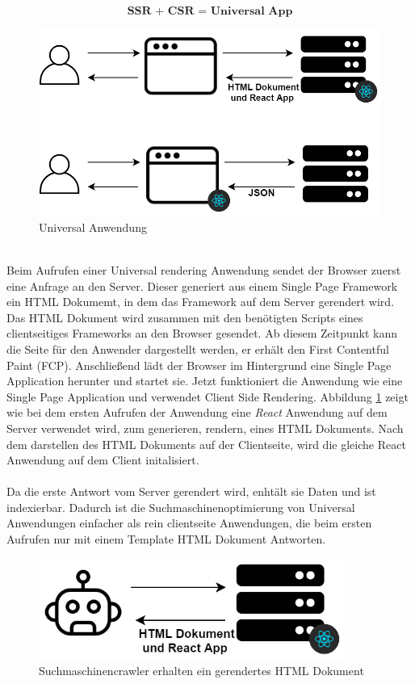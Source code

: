 \documentclass[runningheads]{llncs}
\begin{document}
\begin{equation*}
  \textbf{SSR + CSR = Universal App}
\end{equation*}
\begin{figure}[h]
  \centering
  \includegraphics[width=12cm]{images/react}
  \caption{Universal Anwendung}
  \label{Universal Anwendung}
\end{figure}
\\
Beim Aufrufen einer Universal rendering Anwendung sendet der Browser
zuerst eine Anfrage an den Server. 
Dieser generiert aus einem Single Page Framework ein HTML Dokumemt,
in dem das Framework auf dem Server gerendert wird. 
Das HTML Dokument wird zusammen mit den benötigten Scripts eines clientseitiges Frameworks
an den Browser gesendet.
Ab diesem Zeitpunkt kann die Seite für den Anwender dargestellt werden, 
er erhält den First Contentful Paint (FCP). 
Anschließend lädt der Browser im Hintergrund eine Single Page Application herunter
und startet sie. 
Jetzt funktioniert die Anwendung wie eine Single Page Application und 
verwendet Client Side Rendering. Abbildung \ref{Universal Anwendung} zeigt wie bei dem 
ersten Aufrufen der Anwendung eine \textit{React} Anwendung auf dem Server verwendet wird,
zum generieren, rendern, eines HTML Dokuments. 
Nach dem darstellen des HTML Dokuments auf der Clientseite, 
wird die gleiche React Anwendung auf dem Client initalisiert.
\\
\\
Da die erste Antwort vom Server gerendert wird, enhtält sie Daten und ist
indexierbar. Dadurch ist die Suchmaschinenoptimierung von Universal Anwendungen einfacher
als rein clientseite Anwendungen, die beim ersten Aufrufen nur mit einem Template
HTML Dokument Antworten.
\begin{figure}[h]
  \centering
  \includegraphics[width=10cm]{images/universalseo}
  \caption{Suchmaschinencrawler erhalten ein gerendertes HTML Dokument}
  \label{Suchmaschinencrawler erhalten ein gerendertes HTML Dokument}
\end{figure}
\end{document}
